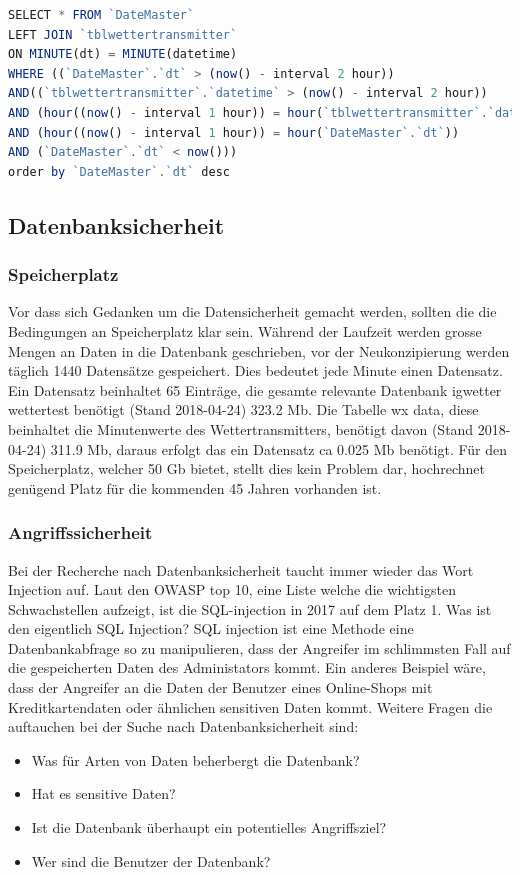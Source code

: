 \begin{lstlisting}[label=lst:LeftJoinQuery,caption=Json Struktur, language=JavaScript, style=htmlcssjs, mathescape]
SELECT * FROM `DateMaster`
LEFT JOIN `tblwettertransmitter`
ON MINUTE(dt) = MINUTE(datetime)
WHERE ((`DateMaster`.`dt` > (now() - interval 2 hour))
AND((`tblwettertransmitter`.`datetime` > (now() - interval 2 hour))
AND (hour((now() - interval 1 hour)) = hour(`tblwettertransmitter`.`datetime`)))
AND (hour((now() - interval 1 hour)) = hour(`DateMaster`.`dt`))
AND (`DateMaster`.`dt` < now()))
order by `DateMaster`.`dt` desc
\end{lstlisting} 

\subsection{Datenbanksicherheit}
\subsubsection{Speicherplatz}
Vor dass sich Gedanken um die Datensicherheit gemacht werden, sollten die die Bedingungen an Speicherplatz klar sein. Während der Laufzeit werden grosse Mengen an Daten in die Datenbank geschrieben, vor der Neukonzipierung werden täglich 1440 Datensätze gespeichert. Dies bedeutet jede Minute einen Datensatz. Ein Datensatz beinhaltet 65 Einträge, die gesamte relevante Datenbank igwetter wettertest benötigt (Stand 2018-04-24) 323.2  Mb. Die Tabelle wx data, diese beinhaltet die Minutenwerte des Wettertransmitters, benötigt davon (Stand 2018-04-24) 311.9 Mb, daraus erfolgt das ein Datensatz ca 0.025 Mb benötigt. Für den Speicherplatz, welcher 50 Gb bietet, stellt dies kein Problem dar, hochrechnet genügend Platz für die kommenden 45 Jahren vorhanden ist.

\subsubsection{Angriffssicherheit}
Bei der Recherche nach Datenbanksicherheit taucht immer wieder das Wort Injection auf. Laut den OWASP top 10, eine Liste welche die wichtigsten Schwachstellen aufzeigt, ist die SQL-injection in 2017 auf dem Platz 1. Was ist den eigentlich SQL Injection? SQL injection ist eine Methode eine Datenbankabfrage so zu manipulieren, dass der Angreifer im schlimmsten Fall auf die gespeicherten Daten des Administators kommt. Ein anderes Beispiel wäre, dass der Angreifer an die Daten der Benutzer eines Online-Shops mit Kreditkartendaten oder ähnlichen sensitiven Daten kommt.
Weitere Fragen die auftauchen bei der Suche nach Datenbanksicherheit sind:
\begin{itemize}
\item Was für Arten von Daten beherbergt die Datenbank?
\item Hat es sensitive Daten?
\item Ist die Datenbank überhaupt ein potentielles Angriffsziel?
\item Wer sind die Benutzer der Datenbank?
\end{itemize}

